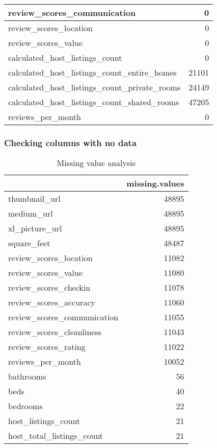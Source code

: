 \documentclass[
]{article}
\begin{document}
\begin{table}[H]
\begin{tabular}{l|r}
\hline
review\_scores\_communication & 0\\
\hline
review\_scores\_location & 0\\
\hline
review\_scores\_value & 0\\
\hline
calculated\_host\_listings\_count & 0\\
\hline
calculated\_host\_listings\_count\_entire\_homes & 21101\\
\hline
calculated\_host\_listings\_count\_private\_rooms & 24149\\
\hline
calculated\_host\_listings\_count\_shared\_rooms & 47205\\
\hline
reviews\_per\_month & 0\\
\hline
\end{tabular}
\end{table}

\hypertarget{checking-columns-with-no-data}{%
\subsubsection{Checking columns with no
data}\label{checking-columns-with-no-data}}

\begin{table}

\caption{\label{tab:unnamed-chunk-23}Missing value analysis}
\centering
\begin{tabular}[t]{l|r}
\hline
  & missing.values\\
\hline
thumbnail\_url & 48895\\
\hline
medium\_url & 48895\\
\hline
xl\_picture\_url & 48895\\
\hline
square\_feet & 48487\\
\hline
review\_scores\_location & 11082\\
\hline
review\_scores\_value & 11080\\
\hline
review\_scores\_checkin & 11078\\
\hline
review\_scores\_accuracy & 11060\\
\hline
review\_scores\_communication & 11055\\
\hline
review\_scores\_cleanliness & 11043\\
\hline
review\_scores\_rating & 11022\\
\hline
reviews\_per\_month & 10052\\
\hline
bathrooms & 56\\
\hline
beds & 40\\
\hline
bedrooms & 22\\
\hline
host\_listings\_count & 21\\
\hline
host\_total\_listings\_count & 21\\
\hline
\end{tabular}
\end{table}
\end{document}

